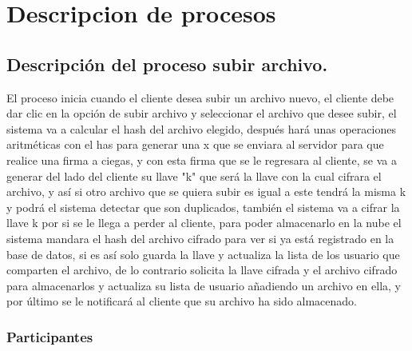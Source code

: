 \section{Descripcion de procesos}

\subsection{Descripción del proceso subir archivo.}

El proceso inicia cuando el cliente desea subir un archivo nuevo, el cliente debe dar clic en la opción de subir archivo y seleccionar el archivo que desee subir, el sistema va a calcular el hash del archivo elegido, después hará unas operaciones aritméticas con el has para generar una x que se enviara al servidor para que realice una firma a ciegas, y con esta firma que se le regresara al cliente, se va a generar del lado del cliente su llave "k" que será la llave con la cual cifrara el archivo, y así si otro archivo que se quiera subir es igual a este tendrá la misma k y podrá el sistema detectar que son duplicados, también el sistema va a cifrar la llave k por si se le llega a perder al cliente, para poder almacenarlo en la nube el sistema mandara el hash del archivo cifrado para ver si ya está registrado en la base de datos, si es así solo guarda la llave y actualiza la lista de los usuario que comparten el archivo, de lo contrario solicita la llave cifrada y el archivo cifrado para almacenarlos y actualiza su lista de usuario añadiendo un archivo en ella, y por último se le notificará al cliente que su archivo ha sido almacenado.



\subsubsection{Participantes}

